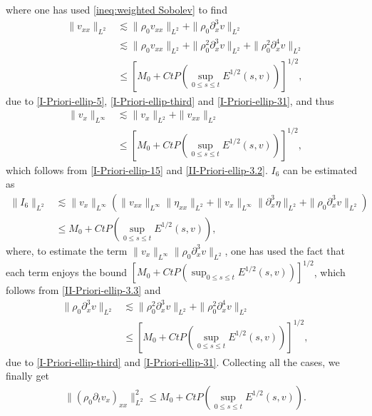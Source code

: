 \documentclass[11pt, reqno]{amsart}
\numberwithin{equation}{section}
\begin{document}
where one has used \eqref{ineq:weighted Sobolev} to find
\begin{equation}\label{II-Priori-ellip-3.2}
\begin{aligned}
\|v_{xx}\|_{L^2}&\lesssim
\|\rho_0v_{xx}\|_{L^2}+\|\rho_0\partial_x^3v\|_{L^2}\\
&\lesssim
\|\rho_0v_{xx}\|_{L^2}+\|\rho_0^2\partial_x^3v\|_{L^2}+\|\rho_0^2\partial_x^4v\|_{L^2}\\
&\leq [M_0+Ct P(\sup_{0\leq s\leq t}E^{1/2}(s,v))]^{1/2},
\end{aligned}
\end{equation}
due to \eqref{I-Priori-ellip-5}, \eqref{I-Priori-ellip-third} and \eqref{I-Priori-ellip-31}, and thus
\begin{equation}\label{II-Priori-ellip-3.3}
	\begin{aligned}
		\|v_x\|_{L^\infty}
		&\lesssim
		\|v_x\|_{L^2}+\|v_{xx}\|_{L^2}\\
		&\leq [M_0+Ct P(\sup_{0\leq s\leq t}E^{1/2}(s,v))]^{1/2},
	\end{aligned}
\end{equation}
which follows from \eqref{I-Priori-ellip-15} and \eqref{II-Priori-ellip-3.2}.
\(I_6\) can be estimated as
\begin{equation*}
\begin{aligned}
\|I_6\|_{L^2}
&\lesssim
\|v_x\|_{L^\infty}(\|v_{xx}\|_{L^\infty}\|\eta_{xx}\|_{L^2}
+\|v_{x}\|_{L^\infty}\|\partial_x^3\eta\|_{L^2}+\|\rho_0\partial_x^3v\|_{L^2})\\
&\leq M_0+Ct P(\sup_{0\leq s\leq t}E^{1/2}(s,v)),
\end{aligned}
\end{equation*}
where, to estimate the term \(\|v_x\|_{L^\infty}\|\rho_0\partial_x^3v\|_{L^2}\), one has used the fact that each term enjoys the bound \([M_0+Ct P(\sup_{0\leq s\leq t}E^{1/2}(s,v))]^{1/2}\), which follows from \eqref{II-Priori-ellip-3.3} and
\begin{equation}\label{II-Priori-ellip-3.4}
\begin{aligned}
\|\rho_0\partial_x^3v\|_{L^2}
&\lesssim
\|\rho_0^2\partial_x^3v\|_{L^2}+\|\rho_0^2\partial_x^4v\|_{L^2}\\
&\leq [M_0+Ct P(\sup_{0\leq s\leq t}E^{1/2}(s,v))]^{1/2},
\end{aligned}
\end{equation}
due to \eqref{I-Priori-ellip-third} and \eqref{I-Priori-ellip-31}.
Collecting all the cases, we finally get
\begin{equation}\label{II-Priori-ellip-3.5}
\begin{aligned}
\|(\rho_0\partial_tv_x)_{xx}\|_{L^2}^2
\leq M_0+Ct P(\sup_{0\leq s\leq t}E^{1/2}(s,v)).
\end{aligned}
\end{equation}
\end{document}
